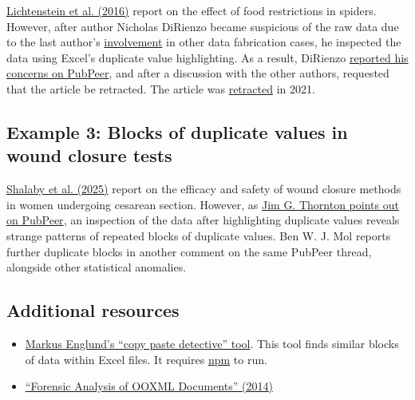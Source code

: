 \documentclass[letterpaper, 12pt]{article}
\begin{document}
\href{http://dx.doi.org/10.1007/s00265-016-2184-1}{Lichtenstein et al. (2016)} report on the effect of food restrictions in spiders.
However, after author Nicholas DiRienzo became suspicious of the raw data due to the last author's \href{https://www.science.org/content/article/university-investigation-found-prominent-spider-biologist-fabricated-falsified-data}{involvement} in other data fabrication cases, he inspected the data using Excel's duplicate value highlighting.
As a result, DiRienzo \href{https://pubpeer.com/publications/1084FEB633DD7021D4D5A954AACFBA}{reported his concerns on PubPeer}, and after a discussion with the other authors, requested that the article be retracted. The article was \href{https://doi.org/10.1007/s00265-021-02998-2}{retracted} in 2021.

\subsection*{Example 3: Blocks of duplicate values in wound closure tests}

\href{https://doi.org/10.1186/s12884-025-07579-z}{Shalaby et al. (2025)} report on the efficacy and safety of wound closure methods in women undergoing cesarean section.
However, as \href{https://pubpeer.com/publications/A8496BE1603BB027C3578E09EBAA67}{Jim G. Thornton points out on PubPeer}, an inspection of the data after highlighting duplicate values reveals strange patterns of repeated blocks of duplicate values. Ben W. J. Mol reports further duplicate blocks in another comment on the same PubPeer thread, alongside other statistical anomalies.

\subsection*{Additional resources}

\begin{itemize}
    \setlength\itemsep{-0.5em}
    \item \href{https://github.com/markusenglund/copy-paste-detective}{Markus Englund's ``copy paste detective'' tool}. This tool finds similar blocks of data within Excel files. It requires \href{https://www.npmjs.com/}{npm} to run.
    \item \href{https://ntnuopen.ntnu.no/ntnu-xmlui/bitstream/handle/11250/198656/EDidriksen.pdf}{``Forensic Analysis of OOXML Documents'' (2014)}
\end{itemize}
\end{document}

